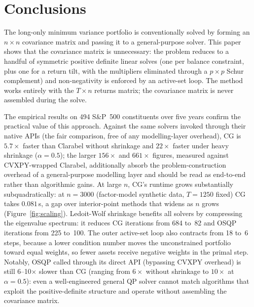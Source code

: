 \section{Conclusions}

The long-only minimum variance portfolio is conventionally solved by forming an $n\times n$
covariance matrix and passing it to a general-purpose solver. This paper shows that the
covariance matrix is unnecessary: the problem reduces to a handful of symmetric positive
definite linear solves (one per balance constraint, plus one for a return tilt, with
the multipliers eliminated through a $p\times p$ Schur complement) and non-negativity
is enforced by an active-set loop. The method works entirely with
the $T\times n$ returns matrix; the covariance matrix is never assembled during
the solve.

The empirical results on 494 S\&P~500 constituents over five years confirm the practical
value of this approach. Against the same solvers invoked through their native APIs
(the fair comparison, free of any modelling-layer overhead), CG is $5.7\times$ faster than
Clarabel without shrinkage and $22\times$ faster under heavy shrinkage ($\alpha=0.5$); the
larger $156\times$ and $661\times$ figures, measured against CVXPY-wrapped Clarabel, additionally
absorb the problem-construction overhead of a general-purpose modelling layer and should be
read as end-to-end rather than algorithmic gains. At large $n$, CG's runtime
grows substantially subquadratically: at $n=3000$ (factor-model synthetic data, $T=1250$ fixed)
CG takes $0.081$\,s, a gap over interior-point methods that widens as $n$ grows
(Figure~\ref{fig:scaling}). Ledoit-Wolf shrinkage benefits all solvers by compressing the
eigenvalue spectrum: it reduces CG iterations from 684 to~82 and OSQP iterations from 225 to~100.
The outer active-set loop also contracts from 18 to~6 steps, because a lower condition number
moves the unconstrained portfolio toward equal weights, so fewer assets receive negative weights
in the primal step. Notably, OSQP called through its direct API
(bypassing CVXPY overhead) is still 6--10$\times$ slower than CG (ranging from $6\times$ without shrinkage to $10\times$ at $\alpha=0.5$):
even a well-engineered general QP solver cannot match algorithms that exploit the
positive-definite structure and operate without assembling the covariance matrix.

